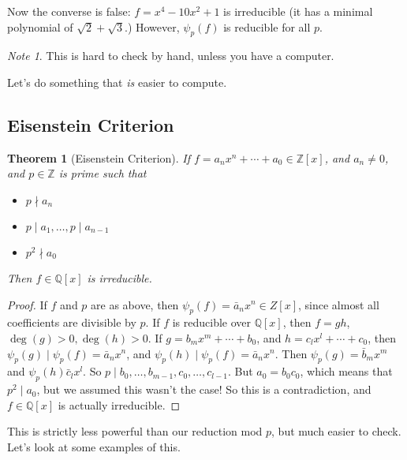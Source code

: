 \documentclass[12pt]{article}
\def\Z{{\mathbb Z}}
\def\Q{{\mathbb Q}}
\newtheorem{theorem}{Theorem}
\theoremstyle{remark}
\theoremstyle{remark}
\theoremstyle{remark}
\theoremstyle{remark}
\theoremstyle{remark}
\newtheorem*{note}{Note}
\begin{document}
Now the converse is false: $f = x^4 - 10x^2 + 1$ is irreducible (it has a
minimal polynomial of $\sqrt{2} + \sqrt{3}$.) However, $\psi_p(f)$ is reducible
for all $p$.

\begin{note}
  This is hard to check by hand, unless you have a computer.
\end{note}

Let's do something that {\it is} easier to compute.

\subsection{Eisenstein Criterion}

\begin{theorem}[Eisenstein Criterion]
  If $f = a_n x^n + \cdots + a_0 \in \Z[x]$, and $a_n \ne 0$, and $p \in \Z$ is
  prime such that

  \begin{itemize}
    \item $p \nmid a_n$
    \item $p \mid a_1, \dots, p \mid a_{n - 1}$
    \item $p^2 \nmid a_0$
  \end{itemize}

  Then $f \in \Q[x]$ is irreducible.
\end{theorem}

\begin{proof}
  If $f$ and $p$ are as above, then $\psi_p(f) = \bar a_n x^n \in Z[x]$, since
  almost all coefficients are divisible by $p$. If $f$ is reducible over
  $\Q[x]$, then $f = gh$, $\deg(g) > 0, \deg(h) > 0$. If $g = b_m x^m + \cdots +
  b_0$, and $h = c_l x^l + \cdots + c_0$, then $\psi_p(g) \mid \psi_p(f) = \bar
  a_n x^n$, and $\psi_p(h) \mid \psi_p(f) = \bar a_n x^n$. Then $\psi_p(g) =
  \bar b_m x^m$ and $\psi_p(h) \bar c_l x^l$. So $p \mid b_0, \dots, b_{m - 1},
  c_0, \dots, c_{l - 1}$. But $a_0 = b_0 c_0$, which means that $p^2 \mid a_0$,
  but we assumed this wasn't the case! So this is a contradiction, and $f \in
  \Q[x]$ is actually irreducible.
\end{proof}

This is strictly less powerful than our reduction mod $p$, but much easier to
check. Let's look at some examples of this.
\end{document}
